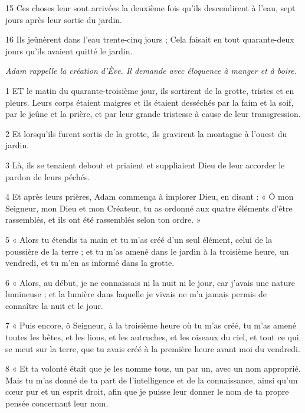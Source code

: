 \par 15 Ces choses leur sont arrivées la deuxième fois qu'ils descendirent à l'eau, sept jours après leur sortie du jardin.

\par 16 Ils jeûnèrent dans l'eau trente-cinq jours ; Cela faisait en tout quarante-deux jours qu'ils avaient quitté le jardin.


\par \textit{Adam rappelle la création d'Ève. Il demande avec éloquence à manger et à boire.}

\par 1 ET le matin du quarante-troisième jour, ils sortirent de la grotte, tristes et en pleurs. Leurs corps étaient maigres et ils étaient desséchés par la faim et la soif, par le jeûne et la prière, et par leur grande tristesse à cause de leur transgression.

\par 2 Et lorsqu'ils furent sortis de la grotte, ils gravirent la montagne à l'ouest du jardin.

\par 3 Là, ils se tenaient debout et priaient et suppliaient Dieu de leur accorder le pardon de leurs péchés.

\par 4 Et après leurs prières, Adam commença à implorer Dieu, en disant : « Ô mon Seigneur, mon Dieu et mon Créateur, tu as ordonné aux quatre éléments d'être rassemblés, et ils ont été rassemblés selon ton ordre. »

\par 5 « Alors tu étendis ta main et tu m'as créé d'un seul élément, celui de la poussière de la terre ; et tu m'as amené dans le jardin à la troisième heure, un vendredi, et tu m'en as informé dans la grotte.

\par 6 « Alors, au début, je ne connaissais ni la nuit ni le jour, car j'avais une nature lumineuse ; et la lumière dans laquelle je vivais ne m’a jamais permis de connaître la nuit et le jour.

\par 7 « Puis encore, ô Seigneur, à la troisième heure où tu m'as créé, tu m'as amené toutes les bêtes, et les lions, et les autruches, et les oiseaux du ciel, et tout ce qui se meut sur la terre, que tu avais créé à la première heure avant moi du vendredi.

\par 8 « Et ta volonté était que je les nomme tous, un par un, avec un nom approprié. Mais tu m'as donné de ta part de l'intelligence et de la connaissance, ainsi qu'un cœur pur et un esprit droit, afin que je puisse leur donner le nom de ta propre pensée concernant leur nom.

